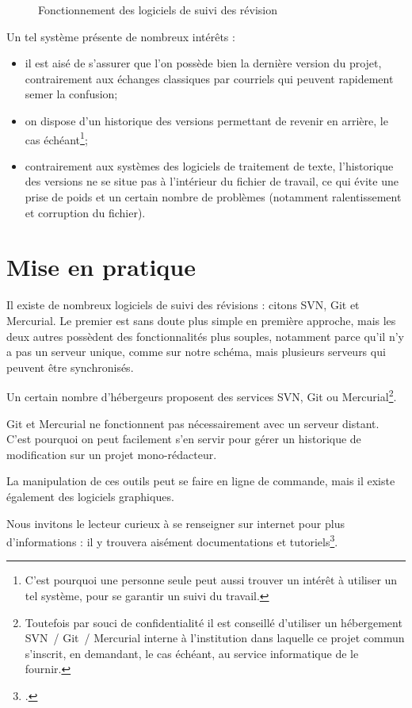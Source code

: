 \begin{figure}[ht]
\centering

\caption{Fonctionnement des logiciels de suivi des révision}\label{svn}
\end{figure}

Un tel système présente de nombreux intérêts :
\begin{itemize}
\item il est aisé de s'assurer que l'on possède bien la dernière version du projet, contrairement aux échanges classiques par courriels qui peuvent rapidement semer la confusion;
\item on dispose d'un historique des versions permettant de revenir en arrière, le cas échéant\footnote{C'est pourquoi une personne seule peut aussi trouver un intérêt à utiliser un tel système, pour se garantir un suivi du travail.};
\item contrairement aux systèmes des logiciels de traitement de texte, l'historique des versions ne se situe pas à l'intérieur du fichier de travail, ce qui évite une prise de poids et un certain nombre de problèmes (notamment ralentissement et corruption du fichier).
\end{itemize}


\section{Mise en pratique}
Il existe de nombreux logiciels de suivi des révisions  : citons SVN, Git et Mercurial. Le premier est sans doute plus simple en première approche, mais les deux autres possèdent des fonctionnalités plus souples, notamment parce qu'il n'y a pas un serveur unique, comme sur notre schéma, mais plusieurs serveurs qui peuvent être synchronisés.

Un certain nombre d'hébergeurs proposent des services SVN, Git ou Mercurial\footnote{Toutefois par souci de confidentialité il est conseillé d'utiliser un hébergement SVN~/ Git~/ Mercurial interne à l'institution dans laquelle ce projet commun s'inscrit, en demandant, le cas échéant, au service informatique de le fournir.}. 

Git et Mercurial ne fonctionnent pas nécessairement avec un serveur distant. C'est pourquoi on peut facilement s'en servir pour gérer un historique de modification sur un projet mono-rédacteur.

La manipulation de ces outils peut se faire en ligne de commande, mais il existe également des logiciels graphiques.

Nous invitons le lecteur curieux à se renseigner sur internet pour plus d'informations : il y trouvera aisément documentations et tutoriels\footcites[Nous recommandons, pour Git, cet excellent livre :][]{progit}[pour notre part, nous avons écrit un petit tutoriel sur l'Utilisation de Git avec une seule personne :][]{git}.
